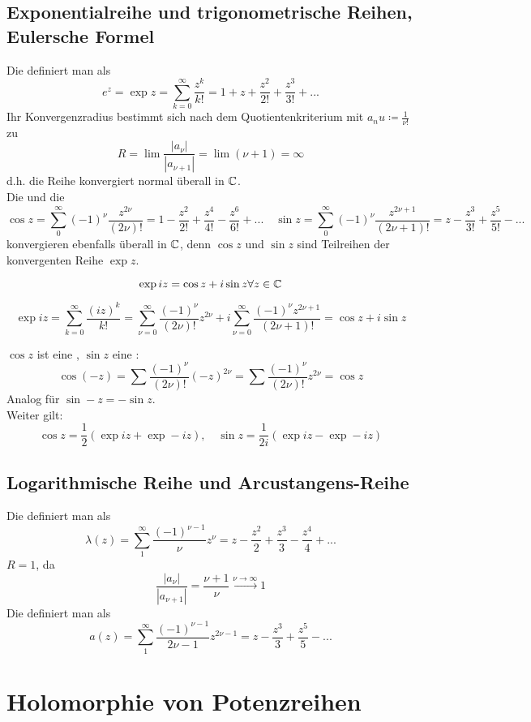 \subsection*{Exponentialreihe und trigonometrische Reihen, Eulersche Formel} Die  definiert man als
\[ e^z=\exp z=\sum_{k=0}^{\infty}\frac{z^k}{k!}=1+z+\frac{z^2}{2!}+\frac{z^3}{3!}+... \]
Ihr Konvergenzradius bestimmt sich nach dem Quotientenkriterium mit $ a_nu\coloneqq\frac{1}{\nu!} $ zu
\[ R=\lim\frac{|a_\nu|}{|a_{\nu+1}|}=\lim (\nu+1)=\infty \]
d.h. die Reihe konvergiert normal \"uberall in $ \mathbb{C} $.\\
Die  und die 
\[ \cos z=\sum_{0}^{\infty}(-1)^\nu\frac{z^{2\nu}}{(2\nu)!}=1-\frac{z^2}{2!}+\frac{z^4}{4!}-\frac{z^6}{6!}+...\quad\sin z=\sum_0^\infty(-1)^\nu\frac{z^{2\nu+1}}{(2\nu+1)!}=z-\frac{z^3}{3!}+\frac{z^5}{5!}-... \]
konvergieren ebenfalls \"uberall in $ \mathbb{C} $, denn $ \cos z $ und $ \sin z $ sind Teilreihen der konvergenten Reihe $ \exp z $.\\
\begin{satz}
	\[ \exp iz=\cos z+i\sin z\forall z\in\mathbb{C} \]
\end{satz}
\begin{beweis}
	\[ \exp iz=\sum_{k=0}^{\infty}\frac{(iz)^k}{k!}=\sum_{\nu=0}^{\infty}\frac{(-1)^\nu}{(2\nu)!}z^{2\nu}+i\sum_{\nu=0}^{\infty}\frac{(-1)^\nu z^{2\nu+1}}{(2\nu+1)!}=\cos z+i\sin z \]
\end{beweis}
$ \cos z $ ist eine , $ \sin z $ eine :
\[ \cos(-z)=\sum\frac{(-1)^\nu}{(2\nu)!}(-z)^{2\nu}=\sum\frac{(-1)^\nu}{(2\nu)!}z^{2\nu}=\cos z \]
Analog f\"ur $ \sin -z=-\sin z $.\\
Weiter gilt:
\[ \cos z=\frac{1}{2}(\exp iz+\exp -iz),\quad \sin z=\frac{1}{2i}(\exp iz-\exp -iz) \] 
\subsection*{Logarithmische Reihe und Arcustangens-Reihe}
Die  definiert man als
\[ \lambda(z)=\sum_1^\infty\frac{(-1)^{\nu-1}}{\nu}z^\nu=z-\frac{z^2}{2}+\frac{z^3}{3}-\frac{z^4}{4}+... \]
$ R=1 $, da
\[ \frac{|a_\nu|}{|a_{\nu+1}|}=\frac{\nu+1}{\nu}\xrightarrow{\nu\to\infty}1 \]
Die  definiert man als
\[ a(z)=\sum_1^\infty\frac{(-1)^{\nu-1}}{2\nu-1}z^{2\nu-1}=z-\frac{z^3}{3}+\frac{z^5}{5}-... \]
\section{Holomorphie von Potenzreihen}
